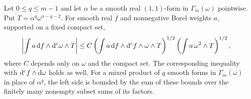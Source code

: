 \begin{lemma}\label{hessian:smooth-torsion}
Let $0\leq q\leq m-1$ and let $\alpha$ be a smooth real $(1,1)$-form
in $\overline{\Gamma_m(\omega)}$ pointwise.
Put $T=\alpha^q\omega^{n-q-2}$. For smooth real $f$
and nonnegative Borel weights $a$, supported on a fixed compact set,
\[
 \left|\int a\,\mathrm df\wedge\mathrm d^{\mathrm c}\omega\wedge T\right|
 \leq C\left(\int a\,\mathrm df\wedge\mathrm d^{\mathrm c} f\wedge\omega\wedge T\right)^{1/2}
          \left(\int a\,\omega^2\wedge T\right)^{1/2},
\]
where $C$ depends only on $\omega$ and the compact set.
The corresponding inequality with $\mathrm d^{\mathrm c} f\wedge\mathrm d\omega$
holds as well. For a mixed product of $q$ smooth forms in
$\overline{\Gamma_m(\omega)}$ in place of $\alpha^q$, the left side
is bounded by the sum of these bounds over the finitely many
nonempty subset sums of its factors.
\end{lemma}
